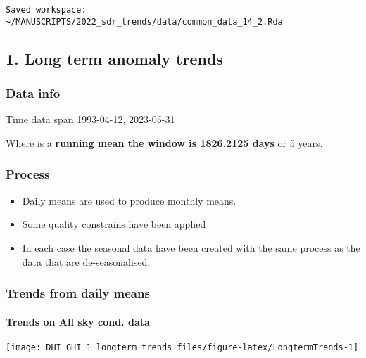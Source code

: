 \documentclass[
  10pt,
  a4paper,oneside]{article}
\providecommand{\tightlist}{%
  \setlength{\itemsep}{0pt}\setlength{\parskip}{0pt}}
\begin{document}
\begin{verbatim}
Saved workspace: ~/MANUSCRIPTS/2022_sdr_trends/data/common_data_14_2.Rda 
\end{verbatim}

\hypertarget{long-term-anomaly-trends}{%
\subsection{1. Long term anomaly trends}\label{long-term-anomaly-trends}}

\hypertarget{data-info}{%
\subsubsection{Data info}\label{data-info}}

Time data span 1993-04-12, 2023-05-31

Where is a \textbf{running mean the window is 1826.2125 days} or
5 years.

\hypertarget{process}{%
\subsubsection{Process}\label{process}}

\begin{itemize}
\tightlist
\item
  Daily means are used to produce monthly means.
\item
  Some quality constrains have been applied
\item
  In each case the seasonal data have been created with the same process as
  the data that are de-seasonalised.
\end{itemize}

\newpage
\FloatBarrier

\hypertarget{trends-from-daily-means}{%
\subsubsection{Trends from daily means}\label{trends-from-daily-means}}

\newpage

\hypertarget{trends-on-all-sky-cond.-data}{%
\paragraph{Trends on All sky cond. data}\label{trends-on-all-sky-cond.-data}}

\begin{center}\texttt{[image: DHI\_GHI\_1\_longterm\_trends\_files/figure-latex/LongtermTrends-1]} \end{center}
\end{document}
